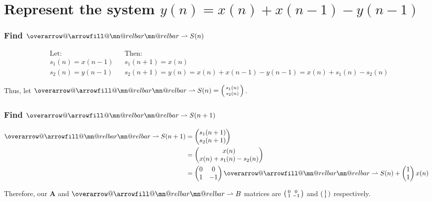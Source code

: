 \documentclass{article}
\makeatletter
\newenvironment{directsubsubs}{
  \makeatletter
  \renewcommand\thesubsubsection{\thesection.\Roman{subsubsection}}
  \makeatother
}{
  \makeatletter
  \renewcommand\thesubsubsection{\thesubsection.\Roman{subsubsection}}
  \makeatother
}
\renewcommand{\thesubsection}{\thesection.\alph{subsection}}
\renewcommand{\thesubsubsection}{\thesection.\alph{subsection}.\Roman{subsubsection}}
\DeclareRobustCommand{\overrightharpoon}{\mathpalette{\overarrow@\rightharpoonfill@}}
\def\rightharpoonfill@{\arrowfill@\mn@relbar\mn@relbar\rightharpoonup}
\makeatother
\begin{document}
\begin{directsubsubs}
\section[Example ~\thesection]{Represent the system $y(n) = x(n) + x(n-1) - y(n-1)$}

\subsubsection[~\thesubsubsection]{Find $\overrightharpoon{S(n)}$}

\begin{align*}
	&\text{Let:} && \text{Then:} \\
	&s_1(n) = x(n-1) && s_1(n+1) = x(n) \\
	&s_2(n) = y(n-1) && s_2(n+1) = y(n) = x(n) + x(n-1) - y(n-1) = x(n) + s_1(n) - s_2(n)
\end{align*}

Thus, let $\overrightharpoon{S(n)} = \begin{psmallmatrix} s_1(n) \\ s_2(n) \end{psmallmatrix}$.

\subsubsection[~\thesubsubsection]{Find $\overrightharpoon{S(n+1)}$}

\begin{align*}
	\overrightharpoon{S(n+1)} &= \begin{pmatrix} s_1(n+1) \\ s_2(n+1) \end{pmatrix} \\
	&= \begin{pmatrix} x(n) \\ x(n) + s_1(n) - s_2(n) \end{pmatrix} \\
	&= \begin{pmatrix} 0 & 0 \\ 1 & -1 \end{pmatrix}\overrightharpoon{S(n)} + \begin{pmatrix} 1 \\ 1 \end{pmatrix}x(n)
\end{align*}

Therefore, our $\boldsymbol{A}$ and $\overrightharpoon{B}$ matrices are $\begin{psmallmatrix} 0 & 0 \\ 1 & -1 \end{psmallmatrix}$ and $\begin{psmallmatrix} 1 \\ 1 \end{psmallmatrix}$ respectively.


\end{directsubsubs}
\end{document}
